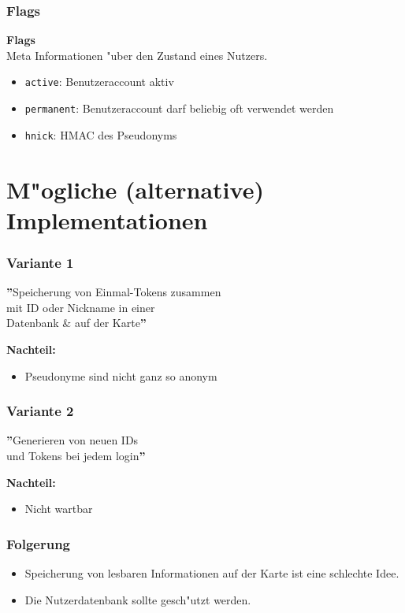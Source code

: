 %
%

\begin{frame}
	\frametitle{Flags}
	\vspace{1cm}

	\textbf{Flags}
	\\
	Meta Informationen "uber den Zustand eines Nutzers.
	\begin{itemize}
		\item \texttt{active}: Benutzeraccount aktiv
		\item \texttt{permanent}: Benutzeraccount darf beliebig oft verwendet werden
		\item \texttt{hnick}: HMAC des Pseudonyms
	\end{itemize}
\end{frame}

\section{M"ogliche (alternative) Implementationen}
\begin{frame}
	\frametitle{Variante 1}
	\textbf{''}Speicherung von Einmal-Tokens zusammen\\
	mit ID oder Nickname in einer\\
	Datenbank \& auf der Karte\textbf{''}

	\vspace{1cm}\par

	\textbf<2->{Nachteil:}
	\begin{itemize}
		\item<2-> Pseudonyme sind nicht ganz so anonym
	\end{itemize}
\end{frame}

\begin{frame}
	\frametitle{Variante 2}
	\textbf{''}Generieren von neuen IDs\\
	und Tokens bei jedem login\textbf{''}

	\vspace{1cm}

	\textbf<2->{Nachteil:}
	\begin{itemize}
		\item<2-> Nicht wartbar
	\end{itemize}
\end{frame}

\begin{frame}
	\frametitle {Folgerung}
	\begin{itemize}
		\item<2-> Speicherung von lesbaren Informationen auf der
		Karte ist eine schlechte Idee.
		\item<3-> Die Nutzerdatenbank sollte gesch"utzt werden.
	\end{itemize}
\end{frame}

